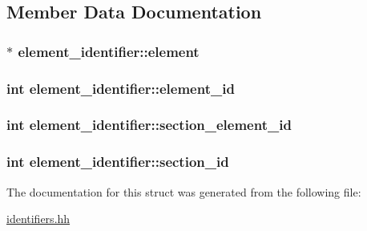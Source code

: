 \subsection{Member Data Documentation}
\hypertarget{structelement__identifier_a0c60a4998b53560e3be639cbda2c51d0}{
\subsubsection[{element}]{$\ast$ element\-\_\-identifier\-::element}}\label{structelement__identifier_a0c60a4998b53560e3be639cbda2c51d0}
\hypertarget{structelement__identifier_a177cd08fd67204a84c9ab045cbbef706}{
\subsubsection[{element\-\_\-id}]{\setlength{\rightskip}{0pt plus 5cm}int element\-\_\-identifier\-::element\-\_\-id}}\label{structelement__identifier_a177cd08fd67204a84c9ab045cbbef706}
\hypertarget{structelement__identifier_a8f54674a7794f520435a7c9cc13057e9}{
\subsubsection[{section\-\_\-element\-\_\-id}]{\setlength{\rightskip}{0pt plus 5cm}int element\-\_\-identifier\-::section\-\_\-element\-\_\-id}}\label{structelement__identifier_a8f54674a7794f520435a7c9cc13057e9}
\hypertarget{structelement__identifier_a28ecafe70b469746ec1a4e2d58511637}{
\subsubsection[{section\-\_\-id}]{\setlength{\rightskip}{0pt plus 5cm}int element\-\_\-identifier\-::section\-\_\-id}}\label{structelement__identifier_a28ecafe70b469746ec1a4e2d58511637}


The documentation for this struct was generated from the following file\-:\begin{DoxyCompactItemize}
\item 
\hyperlink{identifiers_8hh}{identifiers.\-hh}\end{DoxyCompactItemize}
